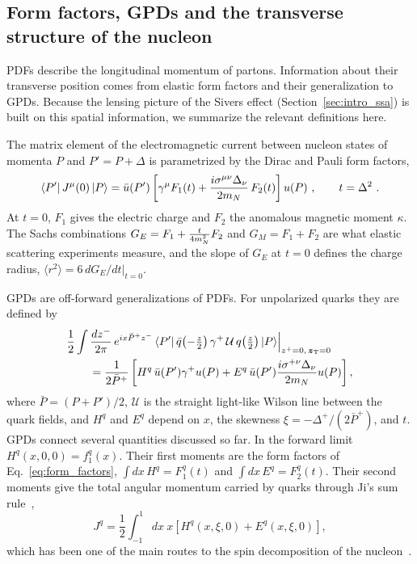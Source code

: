 \subsection{Form factors, GPDs and the transverse structure of the nucleon}
\label{sec:ff_gpd}

PDFs describe the longitudinal momentum of partons. Information about their transverse position comes from elastic form factors and their generalization to GPDs. Because the lensing picture of the Sivers effect (Section~\ref{sec:intro_ssa}) is built on this spatial information, we summarize the relevant definitions here.

The matrix element of the electromagnetic current between nucleon states of momenta $P$ and $P' = P+\Delta$ is parametrized by the Dirac and Pauli form factors,
\begin{equation}
  \langle P'|\,J^\mu(0)\,|P\rangle = \bar{u}(P')\left[\gamma^\mu F_1(t) + \frac{i\sigma^{\mu\nu}\Delta_\nu}{2m_N}\,F_2(t)\right]u(P) \ ,\qquad t = \Delta^2 \ .
  \label{eq:form_factors}
\end{equation}
At $t = 0$, $F_1$ gives the electric charge and $F_2$ the anomalous magnetic moment $\kappa$. The Sachs combinations $G_E = F_1 + \frac{t}{4m_N^2}F_2$ and $G_M = F_1 + F_2$ are what elastic scattering experiments measure, and the slope of $G_E$ at $t=0$ defines the charge radius, $\langle r^2\rangle = 6\,dG_E/dt|_{t=0}$.

GPDs are off-forward generalizations of PDFs. For unpolarized quarks they are defined by~\cite{Muller:1994ses,Ji:1996ek,Radyushkin:1997ki,Diehl:2003ny}
\begin{equation}
\begin{split}
  &\frac{1}{2}\int\frac{dz^-}{2\pi}\,e^{ix\bar{P}^+z^-}\,
  \langle P'|\,\bar{q}\!\left(-\tfrac{z}{2}\right)\gamma^+\,\mathcal{U}\,q\!\left(\tfrac{z}{2}\right)|P\rangle\Big|_{z^+=0,\,\boldsymbol{z}_{\mathrm T}=0}\\
  &\qquad= \frac{1}{2\bar{P}^+}\left[H^q\,\bar{u}(P')\gamma^+u(P) + E^q\,\bar{u}(P')\frac{i\sigma^{+\nu}\Delta_\nu}{2m_N}u(P)\right] ,
\end{split}
  \label{eq:gpd_definition}
\end{equation}
where $\bar{P} = (P+P')/2$, $\mathcal{U}$ is the straight light-like Wilson line between the quark fields, and $H^q$ and $E^q$ depend on $x$, the skewness $\xi = -\Delta^+/(2\bar{P}^+)$, and $t$. GPDs connect several quantities discussed so far. In the forward limit $H^q(x,0,0) = f_1^q(x)$. Their first moments are the form factors of Eq.~\eqref{eq:form_factors}, $\int dx\,H^q = F_1^q(t)$ and $\int dx\,E^q = F_2^q(t)$. Their second moments give the total angular momentum carried by quarks through Ji's sum rule~\cite{Ji:1996ek},
\begin{equation}
  J^q = \frac{1}{2}\int_{-1}^{1}dx\ x\left[H^q(x,\xi,0) + E^q(x,\xi,0)\right] ,
\end{equation}
which has been one of the main routes to the spin decomposition of the nucleon~\cite{Leader:2013jra}.


